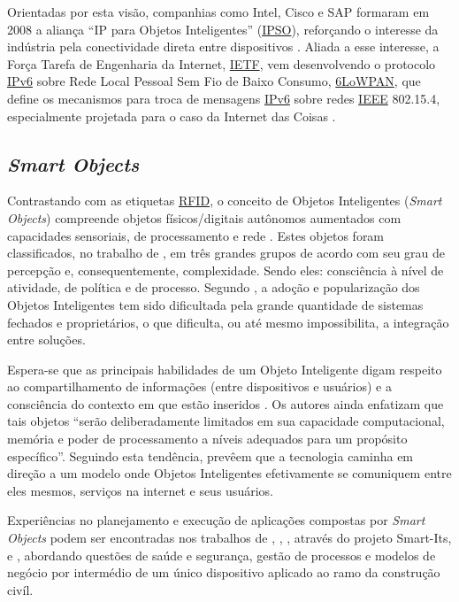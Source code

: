 \documentclass[twoside,english,brazilian]{UNISINOSmonografia}
\begin{document}
	Orientadas por esta visão, companhias como Intel, Cisco e SAP formaram em 
	2008 a aliança ``IP para Objetos Inteligentes'' (\hyperref[siglas]{IPSO}), reforçando o 
	interesse da indústria pela conectividade direta entre dispositivos 
	\cite{Dunkels2008, Mattern2010a}. 
	Aliada a esse interesse, a Força Tarefa de Engenharia da Internet, \hyperref[siglas]{IETF}, 
	vem desenvolvendo o protocolo \hyperref[siglas]{IPv6} sobre Rede Local Pessoal Sem Fio de 
	Baixo Consumo, \hyperref[siglas]{6LoWPAN}, que define os mecanismos para troca de mensagens 
	\hyperref[siglas]{IPv6} sobre redes \hyperref[siglas]{IEEE} 802.15.4, especialmente projetada para o caso da 
	Internet das Coisas \cite{Gomez2010}.

\subsection{\textit{Smart Objects}}
	Contrastando com as etiquetas \hyperref[siglas]{RFID}, o conceito de Objetos Inteligentes 
	(\textit{Smart Objects}) compreende objetos físicos/digitais autônomos 
	aumentados com capacidades sensoriais, de processamento e rede 
	\cite{Gellersen2001}.
	Estes objetos foram classificados, no trabalho de , em 
	três grandes grupos de acordo com seu grau de percepção e, 
	consequentemente, complexidade. Sendo eles: consciência à nível de 
	atividade, de política e de processo.
	Segundo , a adoção e popularização dos Objetos 
	Inteligentes tem sido dificultada pela grande quantidade de sistemas 
	fechados e proprietários, o que dificulta, ou até mesmo impossibilita, a 
	integração entre soluções. 
	
	Espera-se que as principais habilidades de um Objeto Inteligente digam 
	respeito ao compartilhamento de informações (entre dispositivos e 
	usuários) e a consciência do contexto em que estão inseridos 
	\cite{Gellersen2001}. 
	Os autores ainda enfatizam que tais objetos ``serão deliberadamente 
	limitados em sua capacidade computacional, memória e poder de 
	processamento a níveis adequados para um propósito específico''. 
	Seguindo esta tendência,  prevêem que a tecnologia 
	caminha em direção a um modelo onde Objetos Inteligentes efetivamente se 
	comuniquem entre eles mesmos, serviços na internet e seus usuários.
	
	Experiências no planejamento e execução de aplicações compostas por 
	\textit{Smart Objects} podem ser encontradas nos trabalhos de 
	, , 
	, através do projeto Smart-Its, e 
	, abordando questões de saúde e segurança, gestão 
	de processos e modelos de negócio por intermédio de um único dispositivo 
	aplicado ao ramo da construção civíl.
\end{document}
